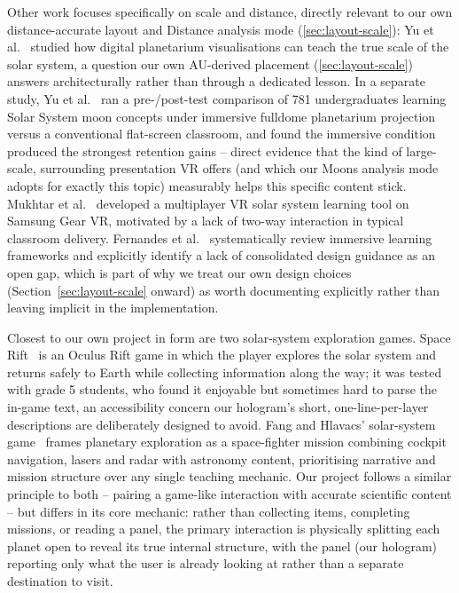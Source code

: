 \documentclass[journal]{vgtc}
\begin{document}
Other work focuses specifically on scale and distance, directly relevant to our own distance-accurate layout and Distance analysis mode (\cref{sec:layout-scale}): Yu et al.~\cite{yu2017} studied how digital planetarium visualisations can teach the true scale of the solar system, a question our own AU-derived placement (\cref{sec:layout-scale}) answers architecturally rather than through a dedicated lesson. In a separate study, Yu et al.~\cite{yumoons} ran a pre-/post-test comparison of 781 undergraduates learning Solar System moon concepts under immersive fulldome planetarium projection versus a conventional flat-screen classroom, and found the immersive condition produced the strongest retention gains -- direct evidence that the kind of large-scale, surrounding presentation VR offers (and which our Moons analysis mode adopts for exactly this topic) measurably helps this specific content stick. Mukhtar et al.~\cite{mukhtar2019} developed a multiplayer VR solar system learning tool on Samsung Gear VR, motivated by a lack of two-way interaction in typical classroom delivery. Fernandes et al.~\cite{fernandes2022} systematically review immersive learning frameworks and explicitly identify a lack of consolidated design guidance as an open gap, which is part of why we treat our own design choices (Section~\ref{sec:layout-scale} onward) as worth documenting explicitly rather than leaving implicit in the implementation.

Closest to our own project in form are two solar-system exploration games. Space Rift~\cite{pena} is an Oculus Rift game in which the player explores the solar system and returns safely to Earth while collecting information along the way; it was tested with grade 5 students, who found it enjoyable but sometimes hard to parse the in-game text, an accessibility concern our hologram's short, one-line-per-layer descriptions are deliberately designed to avoid. Fang and Hlavacs' solar-system game~\cite{fang} frames planetary exploration as a space-fighter mission combining cockpit navigation, lasers and radar with astronomy content, prioritising narrative and mission structure over any single teaching mechanic. Our project follows a similar principle to both -- pairing a game-like interaction with accurate scientific content -- but differs in its core mechanic: rather than collecting items, completing missions, or reading a panel, the primary interaction is physically splitting each planet open to reveal its true internal structure, with the panel (our hologram) reporting only what the user is already looking at rather than a separate destination to visit.
\end{document}
